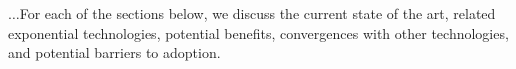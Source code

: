 \documentclass[letter,11pt]{article}
\begin{document}

$\ldots$For each of the sections below, we discuss the current state of the art,
related exponential technologies, potential benefits, convergences with other
technologies, and potential barriers to adoption.

\secttoc



\clearpage
{}
{}
\nocite{*}



\clearpage
{}
{}
\printglossaries

\newpage
{}
{}
\printindex
\end{document}
